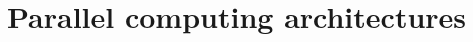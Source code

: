 \chapter{Parallel computing architectures}\label{chap:parallelArchitectures}
                                                                                                                                                                                                                                                                                                                                                                                                                                                                                                                                                                                                                                                                                                                                                                                                                                                                                                                                                                                                                                                                                                                                                                                                                                                                                                                                                                                                                                                                                                                                                                                                                                                                                                                                                                                                                                                                                                                                                                                                                                                                                                                                                                                                                                                                                                                                                                                                                                                                                                                                                                                                                                                                                                                                                                                                                                                                                                                                                              
